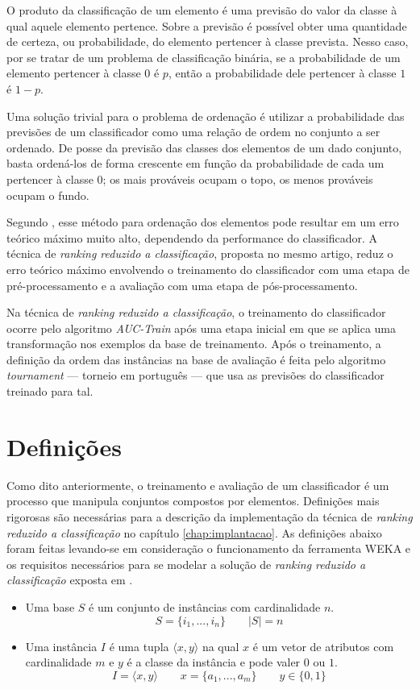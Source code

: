 O produto da classificação de um elemento é uma previsão do valor da classe à qual aquele elemento pertence. Sobre a previsão é possível obter uma quantidade de certeza, ou probabilidade, do elemento pertencer à classe prevista. Nesso caso, por se tratar de um problema de classificação binária, se a probabilidade de um elemento pertencer à classe $0$ é $p$, então a probabilidade dele pertencer à classe $1$ é $1 - p$.

Uma solução trivial para o problema de ordenação é utilizar a probabilidade das previsões de um classificador como uma relação de ordem no conjunto a ser ordenado. De posse da previsão das classes dos elementos de um dado conjunto, basta ordená-los de forma crescente em função da probabilidade de cada um pertencer à classe $0$; os mais prováveis ocupam o topo, os menos prováveis ocupam o fundo.

Segundo \cite{langford08}, esse método para ordenação dos elementos pode resultar em um erro teórico máximo muito alto, dependendo da performance do classificador. A técnica de \emph{ranking reduzido a classificação}, proposta no mesmo artigo, reduz o erro teórico máximo envolvendo o treinamento do classificador com uma etapa de pré-processamento e a avaliação com uma etapa de pós-processamento.

Na técnica de \emph{ranking reduzido a classificação}, o treinamento do classificador ocorre pelo algoritmo \emph{AUC-Train} após uma etapa inicial em que se aplica uma transformação nos exemplos da base de treinamento. Após o treinamento, a definição da ordem das instâncias na base de avaliação é feita pelo algoritmo \emph{tournament} --- torneio em português --- que usa as previsões do classificador treinado para tal.

\section{Definições}

Como dito anteriormente, o treinamento e avaliação de um classificador é um processo que manipula conjuntos compostos por elementos. Definições mais rigorosas são necessárias para a descrição da implementação da técnica de \emph{ranking reduzido a classificação} no capítulo \ref{chap:implantacao}. As definições abaixo foram feitas levando-se em consideração o funcionamento da ferramenta WEKA e os requisitos necessários para se modelar a solução de \emph{ranking reduzido a classificação} exposta em \cite{langford08}.

\begin{itemize}
    \item Uma base $S$ é um conjunto de instâncias com cardinalidade $n$.
    \[S = \{i_1, ..., i_n\} \qquad |S| = n\]

    \item Uma instância $I$ é uma tupla $\langle x, y \rangle$ na qual $x$ é um vetor de atributos com cardinalidade $m$ e $y$ é a classe da instância e pode valer $0$ ou $1$.
    \[I = \langle x, y \rangle \qquad x = \{a_1, ..., a_m\} \qquad y \in \{0, 1\}\]
\end{itemize}

